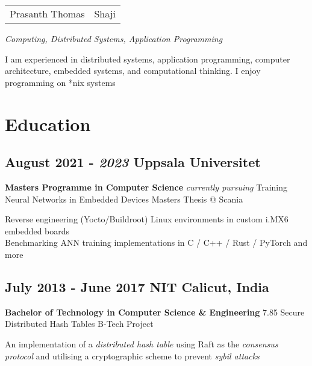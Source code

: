 \documentclass{scrartcl}
\begin{document}
\newcommand{\hll}[1]{{\color{RawSienna}#1}}
\newcommand{\hlp}[1]{{\color{Maroon}#1}}

	\begin{center}
		\begin{tabular}{rl}
			\huge Prasanth Thomas & \huge Shaji
		\end{tabular}
	\end{center}

	\begin{center}
		\itshape Computing, Distributed Systems, Application Programming
	\end{center}

	\vfill

	I am experienced in distributed systems, application programming, computer architecture, embedded systems, and computational thinking. I enjoy programming on *nix systems

	\section{Education}

		\subsection[Uppsala Universitet]{August 2021 - \textit{2023} \hfill Uppsala Universitet}
		\textbf{\large Masters Programme in Computer Science} \hfill \textit{currently pursuing} \newline
		Training Neural Networks in Embedded Devices \hfill Masters Thesis @ Scania

		Reverse engineering (\hlp{Yocto}/\hlp{Buildroot}) Linux environments in custom i.MX6 embedded boards \\
		Benchmarking ANN training implementations in \hll{C} / \hll{C++} / \hll{Rust} / \hlp{PyTorch} and more

		\subsection[NITC]{July 2013 - June 2017 \hfill NIT Calicut, India}
		\textbf{\large Bachelor of Technology in Computer Science \& Engineering} \hfill 7.85 \newline
		Secure Distributed Hash Tables \hfill B-Tech Project

	An implementation of a \textit{distributed hash table} using \hlp{Raft} as the \textit{consensus protocol} and utilising a cryptographic scheme to prevent \textit{sybil attacks}
\end{document}

